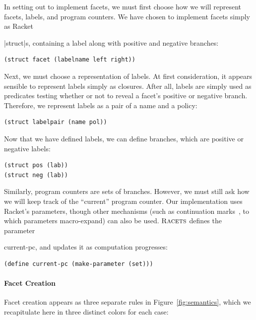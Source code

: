 \documentclass[review=true,acmlarge]{acmart}
\newcommand*{\SavedLstInline}{}
\DeclareRobustCommand*{\lstinline}{%
  \ifmmode
    \let\SavedBGroup\bgroup
    \def\bgroup{%
      \let\bgroup\SavedBGroup
      \hbox\bgroup
    }%
  \fi
  \SavedLstInline
}
\newcommand{\code}[1]{\lstinline{#1}}
\newcommand{\racets}[0]{$\textsc{Racets}$\xspace}
\begin{document}
In setting out to implement facets, we must first choose how we will
represent facets, labels, and program counters. We have chosen to
implement facets simply as Racket \lstinline|struct|s, containing a
label along with positive and negative branches:

\begin{lstlisting}[language=Racket,escapechar=|,name=racets]
(struct facet (labelname left right))
\end{lstlisting}

Next, we must choose a representation of labels. At first
consideration, it appears sensible to represent labels simply as
closures. After all, labels are simply used as predicates testing
whether or not to reveal a facet's positive or negative
branch. Therefore, we represent labels as a pair of a name and a policy:

\begin{lstlisting}[language=Racket,escapechar=|,name=racets]
(struct labelpair (name pol))
\end{lstlisting}

Now that we have defined labels, we can define branches, which are
positive or negative labels:

\begin{lstlisting}[language=Racket,escapechar=|,name=racets]
(struct pos (lab))
(struct neg (lab))
\end{lstlisting}

Similarly, program counters are sets of branches. However, we must
still ask how we will keep track of the ``current'' program
counter. Our implementation uses Racket's parameters, though other
mechanisms (such as continuation marks~\cite{clements2001modeling}, to which parameters
macro-expand) can also be used. \racets defines the parameter
\code{current-pc}, and updates it as computation progresses:

\begin{lstlisting}[language=Racket,escapechar=|,name=racets]
(define current-pc (make-parameter (set)))
\end{lstlisting}

\paragraph*{Facet Creation}

Facet creation appears as three separate rules in
Figure~\ref{fig:semantics}, which we recapitulate here in three
distinct colors for each case:
\end{document}
